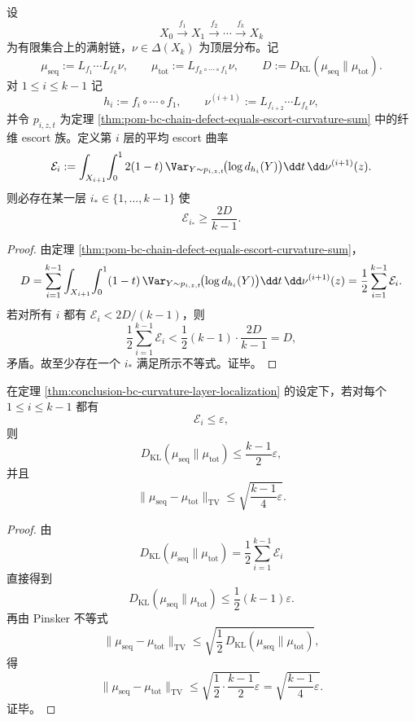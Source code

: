 \begin{theorem}\label{thm:conclusion-bc-curvature-layer-localization}
设
\[
X_0\xrightarrow{f_1}X_1\xrightarrow{f_2}\cdots\xrightarrow{f_k}X_k
\]
为有限集合上的满射链，\(\nu\in\Delta(X_k)\) 为顶层分布。记
\[
\mu_{\mathrm{seq}}:=L_{f_1}\cdots L_{f_k}\nu,
\qquad
\mu_{\mathrm{tot}}:=L_{f_k\circ\cdots\circ f_1}\nu,
\qquad
D:=D_{\mathrm{KL}}(\mu_{\mathrm{seq}}\|\mu_{\mathrm{tot}}).
\]
对 \(1\le i\le k-1\) 记
\[
h_i:=f_i\circ\cdots\circ f_1,
\qquad
\nu^{(i+1)}:=L_{f_{i+2}}\cdots L_{f_k}\nu,
\]
并令 \(p_{i,z,t}\) 为定理 \ref{thm:pom-bc-chain-defect-equals-escort-curvature-sum} 中的纤维 escort 族。定义第 \(i\) 层的平均 escort 曲率
\[
\mathcal E_i
:=
\int_{X_{i+1}}\!\int_0^1
2(1-t)\,
\Var_{Y\sim p_{i,z,t}}\!\bigl(\log d_{h_i}(Y)\bigr)
\dd t\,\dd \nu^{(i+1)}(z).
\]
则必存在某一层 \(i_\ast\in\{1,\dots,k-1\}\) 使
\[
\mathcal E_{i_\ast}\ge \frac{2D}{k-1}.
\]
\end{theorem}
\begin{proof}
由定理 \ref{thm:pom-bc-chain-defect-equals-escort-curvature-sum}，
\[
D
=
\sum_{i=1}^{k-1}
\int_{X_{i+1}}\!\int_0^1
(1-t)\,
\Var_{Y\sim p_{i,z,t}}\!\bigl(\log d_{h_i}(Y)\bigr)
\dd t\,\dd \nu^{(i+1)}(z)
=\frac12\sum_{i=1}^{k-1}\mathcal E_i.
\]
若对所有 \(i\) 都有 \(\mathcal E_i<2D/(k-1)\)，则
\[
\frac12\sum_{i=1}^{k-1}\mathcal E_i
<
\frac12(k-1)\cdot \frac{2D}{k-1}
=D,
\]
矛盾。故至少存在一个 \(i_\ast\) 满足所示不等式。证毕。
\end{proof}

\begin{corollary}[逐层小曲率的严格化判据与总变差控制]\label{cor:conclusion-bc-small-curvature-strictification-tv}
在定理 \ref{thm:conclusion-bc-curvature-layer-localization} 的设定下，若对每个 \(1\le i\le k-1\) 都有
\[
\mathcal E_i\le \varepsilon,
\]
则
\[
D_{\mathrm{KL}}(\mu_{\mathrm{seq}}\|\mu_{\mathrm{tot}})
\le \frac{k-1}{2}\varepsilon,
\]
并且
\[
\|\mu_{\mathrm{seq}}-\mu_{\mathrm{tot}}\|_{\mathrm{TV}}
\le \sqrt{\frac{k-1}{4}\varepsilon}.
\]
\end{corollary}
\begin{proof}
由
\[
D_{\mathrm{KL}}(\mu_{\mathrm{seq}}\|\mu_{\mathrm{tot}})
=\frac12\sum_{i=1}^{k-1}\mathcal E_i
\]
直接得到
\[
D_{\mathrm{KL}}(\mu_{\mathrm{seq}}\|\mu_{\mathrm{tot}})
\le \frac12(k-1)\varepsilon.
\]
再由 Pinsker 不等式
\[
\|\mu_{\mathrm{seq}}-\mu_{\mathrm{tot}}\|_{\mathrm{TV}}
\le \sqrt{\frac12\,D_{\mathrm{KL}}(\mu_{\mathrm{seq}}\|\mu_{\mathrm{tot}})},
\]
得
\[
\|\mu_{\mathrm{seq}}-\mu_{\mathrm{tot}}\|_{\mathrm{TV}}
\le
\sqrt{\frac12\cdot \frac{k-1}{2}\varepsilon}
=
\sqrt{\frac{k-1}{4}\varepsilon}.
\]
证毕。
\end{proof}

